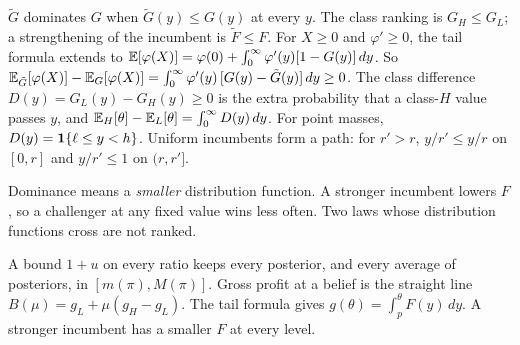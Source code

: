 \(\tilde G\) dominates \(G\) when \(\tilde G(y)\le G(y)\) at every \(y\). The class ranking is \(G_H\le G_L\); a strengthening of the incumbent is \(\tilde F\le F\).
For \(X\ge0\) and \(\varphi'\ge0\), the tail formula extends to
\(\mathbb{E}[\varphi(X)]=\varphi(0)+\int_0^\infty\varphi'(y)[1-G(y)]\,dy\). So \(\mathbb{E}_{\tilde G}[\varphi(X)]-\mathbb{E}_G[\varphi(X)]=\int_0^\infty\varphi'(y)\,[G(y)-\tilde G(y)]\,dy\ge0\).
The class difference \(D(y)=G_L(y)-G_H(y)\ge0\) is the extra probability that a class-\(H\) value passes \(y\), and
\(\mathbb{E}_H[\theta]-\mathbb{E}_L[\theta]=\int_0^\infty D(y)\,dy\). For point masses, \(D(y)=\mathbf{1}\{\ell\le y<h\}\). Uniform incumbents
form a path: for \(r'>r\), \(y/r'\le y/r\) on \([0,r]\) and \(y/r'\le1\) on \((r,r']\).

\begin{watchout}
Dominance means a \emph{smaller} distribution function. A stronger incumbent lowers \(F\), so a challenger at any
fixed value wins less often. Two laws whose distribution functions cross are not ranked.
\end{watchout}

\begin{chaptersummary}
A bound \(1+u\) on every ratio keeps every
posterior, and every average of posteriors, in \([m(\pi),M(\pi)]\). Gross profit at a belief is the straight line
\(B(\mu)=g_L+\mu(g_H-g_L)\). The tail formula gives \(g(\theta)=\int_p^\theta F(y)\,dy\). A stronger incumbent has a smaller \(F\) at every level.
\end{chaptersummary}
